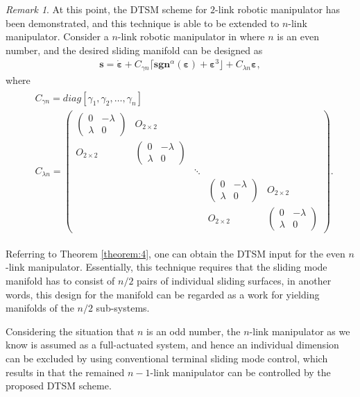 \documentclass[3p]{elsarticle}
\theoremstyle{plain}
\theoremstyle{remark}
\newtheorem{myrem}{Remark}
\begin{document}
\begin{myrem}
At this point, the DTSM scheme for $2$-link robotic manipulator has been demonstrated, and this technique is able to be extended to $n$-link manipulator. Consider a $n$-link robotic manipulator in where $n$ is an even number, and the desired sliding manifold can be designed as
\begin{align}
\bm s = \dot{\bm \varepsilon}+C_{\gamma n}\lceil\bm{sgn}^\alpha(\bm \varepsilon)+\bm\varepsilon^3\rfloor+C_{\lambda n}{\bm\varepsilon},
\end{align}
where
\begin{align}
\begin{split}
&C_{\gamma n}=diag[\gamma_1,\gamma_2,\ldots,\gamma_n]\\
&C_{\lambda n}=
\begin{pmatrix}
\begin{pmatrix}
0 &-\lambda\\ \lambda &0
\end{pmatrix} &O_{2\times 2} & & &\\
O_{2\times 2} &\begin{pmatrix}
0 &-\lambda\\ \lambda &0
\end{pmatrix} & & &\\
& &\ddots & &\\
& & &\begin{pmatrix}
0 &-\lambda\\ \lambda &0
\end{pmatrix} &O_{2\times 2}\\
& & &O_{2\times 2} &\begin{pmatrix}
0 &-\lambda\\ \lambda &0
\end{pmatrix}
\end{pmatrix}.
\end{split}
\end{align}\par
Referring to Theorem \ref{theorem:4}, one can obtain the DTSM input for the even $n$-link manipulator. Essentially, this technique requires that the sliding mode manifold has to consist of $n/2$ pairs of individual sliding surfaces, in another words, this design for the manifold can be regarded as a work for yielding manifolds of the $n/2$ sub-systems.\par
Considering the situation that $n$ is an odd number, the $n$-link manipulator as we know is assumed as a full-actuated system, and hence an individual dimension can be excluded by using conventional terminal sliding mode control, which results in that the remained $n-1$-link manipulator can be controlled by the proposed DTSM scheme.
\end{myrem}
\end{document}
